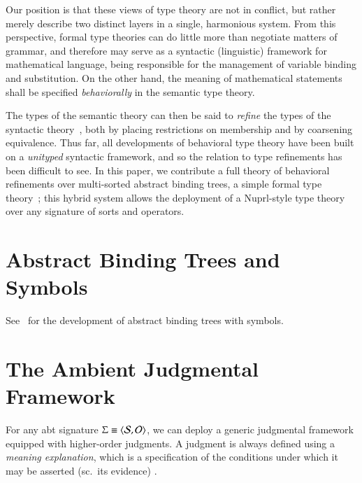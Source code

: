 \documentclass[11pt]{article}
\newif\ifcolored%
\theoremstyle{definition}
\theoremstyle{remark}
\numberwithin{equation}{section}
\def\IModeColorName{MidnightBlue}
\def\OModeColorName{Maroon}
\def\IModeColorName{Black}
\def\OModeColorName{Black}
\newcommand\IMode[1]{{\color{\IModeColorName}{#1}}}
\newcommand\OMode[1]{{\color{\OModeColorName}{#1}}}
\newcommand\Match[2]{\IMode{#1}\equiv\OMode{#2}}
\newcommand\Sorts{\mathcal{S}}
\newcommand\Operators{\mathcal{O}}
\newcommand\Pair[2]{\left\langle#1, #2 \right\rangle}
\begin{document}
Our position is that these views of type theory are not in conflict, but rather
merely describe two distinct layers in a single, harmonious system. From this
perspective, formal type theories can do little more than negotiate matters of
grammar, and therefore may serve as a syntactic (linguistic) framework
for mathematical language, being responsible for the management of variable
binding and substitution. On the other hand, the meaning of mathematical
statements shall be specified \emph{behaviorally} in the semantic type
theory.

The types of the semantic theory can then be said to \emph{refine} the types of
the syntactic theory~\cite{harper-davies:2014, harper-duff:2015, harper:2016},
both by placing restrictions on membership and by coarsening equivalence. Thus
far, all developments of behavioral type theory have been built on a
\emph{unityped} syntactic framework, and so the relation to type refinements
has been difficult to see. In this paper, we contribute a full theory of
behavioral refinements over multi-sorted abstract binding trees, a simple
formal type theory~\cite{harper:2016, sterling-morrison:2015}; this hybrid
system allows the deployment of a Nuprl-style type theory over any signature of
sorts and operators.

\section{Abstract Binding Trees and Symbols}

See~\cite{sterling-morrison:2015} for the development of abstract binding trees
with symbols. 

\section{The Ambient Judgmental Framework}
\label{section:ambient-lf}

\ifcolored%
In this paper, we hint at the \emph{modes} of judgments and
assertions~\cite{harper:2016} using colors, marking inputs with
$\IMode{\texttt{blue}}$ and outputs with $\OMode{\texttt{red}}$. As a rule of
thumb, inputs are things which are supplied when checking the correctness of a
judgment, and outputs are things which are synthesized in the process. \fi

For any abt signature $\Match{\Sigma}{\Pair{\Sorts}{\Operators}}$, we can
deploy a generic judgmental framework equipped with higher-order judgments. A
judgment is always defined using a \emph{meaning explanation}, which is a
specification of the conditions under which it may be asserted (sc.\ its
evidence) \cite{martin-lof:1996}.
\end{document}
